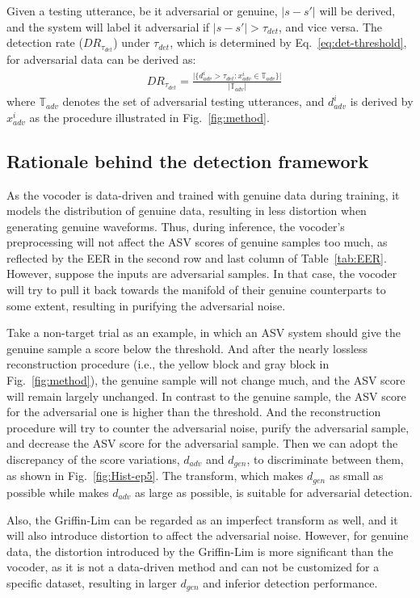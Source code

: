 Given a testing utterance, be it adversarial or genuine, $|s-s'|$ will be derived, and the system will label it adversarial if $|s-s'| > \tau_{det}$, and vice versa.
The detection rate ($DR_{\tau_{det}}$) under $\tau_{det}$, which is determined by Eq.~\ref{eq:det-threshold}, for adversarial data can be derived as:
\begin{align}
    &DR_{\tau_{det}} = \frac{\vert \{ d_{adv}^{i} > \tau_{det} : x_{adv}^{i} \in \mathbb{T}_{adv} \} \vert}{\vert \mathbb{T}_{adv} \vert} \label{eq:det-rate} 
\end{align}
where $\mathbb{T}_{adv}$ denotes the set of adversarial testing utterances, and $d_{adv}^{i}$ is derived by $x_{adv}^{i}$ as the procedure illustrated in Fig.~\ref{fig:method}.

\subsection{Rationale behind the detection framework}
As the vocoder is data-driven and trained with genuine data during training, it models the distribution of genuine data, resulting in less distortion when generating genuine waveforms.
Thus, during inference, the vocoder's preprocessing will not affect the ASV scores of genuine samples too much, as reflected by the EER in the second row and last column of Table~\ref{tab:EER}.
However, suppose the inputs are adversarial samples. In that case, the vocoder will try to pull it back towards the manifold of their genuine counterparts to some extent, resulting in purifying the adversarial noise.

Take a non-target trial as an example, in which an ASV system should give the genuine sample a score below the threshold.
And after the nearly lossless reconstruction procedure (i.e., the yellow block and gray block in Fig.~\ref{fig:method}), the genuine sample will not change much, and the ASV score will remain largely unchanged.
In contrast to the genuine sample, the ASV score for the adversarial one is higher than the threshold.
And the reconstruction procedure will try to counter the adversarial noise, purify the adversarial sample, and decrease the ASV score for the adversarial sample. 
Then we can adopt the discrepancy of the score variations, $d_{adv}$ and $d_{gen}$, to discriminate between them, as shown in Fig.~\ref{fig:Hist-ep5}.
The transform, which makes $d_{gen}$ as small as possible while makes $d_{adv}$ as large as possible, is suitable for adversarial detection.

Also, the Griffin-Lim can be regarded as an imperfect transform as well, and it will also introduce distortion to affect the adversarial noise.
However, for genuine data, the distortion introduced by the Griffin-Lim is more significant than the vocoder, as it is not a data-driven method and can not be customized for a specific dataset, resulting in larger $d_{gen}$ and inferior detection performance.
